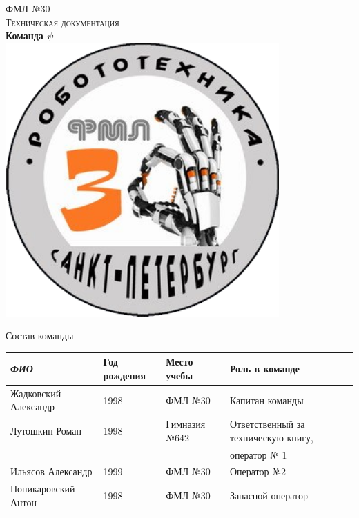 \documentclass[11pt]{article}
\begin{document}
   \begin{titlepage}
      \begin{center}
           \textsc{\LARGE{ФМЛ №30}}\\[1.5cm]
	\textsc{\Large Техническая документация}\\[0.5cm]
	{ \huge \bfseries Команда $\psi$ \\[0.4cm] }
	\includegraphics[width=105mm,height=105mm]{img/icon.png}
      \end{center}
   \end{titlepage}
	\newpage
	
	\LARGE{Состав команды}
		\begin{table}[h]
			\begin{tabular}{|l|l|l|l|}
				\hline
				\textit{ФИО}         & Год рождения & Место учебы   & Роль в команде                      \\ \hline
				Жадковский Александр &  1998        & ФМЛ №30       & Капитан команды                     \\ \hline
				Лутошкин Роман       &  1998        & Гимназия №642 & Ответственный за техническую книгу, \\
				                     &              &               & оператор № 1                        \\ \hline
				Ильясов Александр    &  1999        & ФМЛ №30       & Оператор №2                         \\ \hline
				Поникаровский Антон  & 1998         & ФМЛ №30       & Запасной оператор                   \\ \hline
			\end{tabular}
		\end{table}
		\newpage
		
\end{document}
